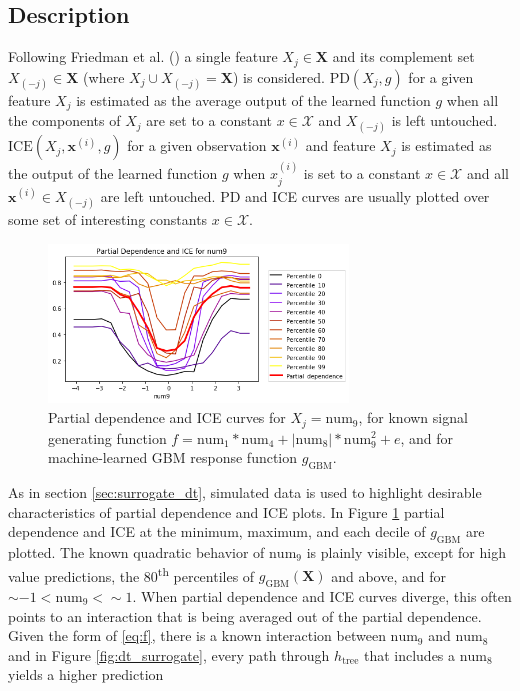 \documentclass{article}
\begin{document}
\subsection{Description}
	
Following Friedman et al. (\citeyear{esl}) a single feature $X_j \in \mathbf{X}$ and its complement set $X_{(-j)} \in \mathbf{X}$ (where $X_j \cup X_{(-j)} = \mathbf{X}$) is considered. $\text{PD}(X_j, g)$ for a given feature $X_j$ is estimated as the average output of the learned function $g$ when all the components of $X_j$ are set to a constant $x \in \mathcal{X}$ and $X_{(-j)}$ is left untouched. $\text{ICE}(X_j, \mathbf{x}^{(i)}, g)$ for a given observation $\mathbf{x}^{(i)}$ and feature $X_j$ is estimated as the output of the learned function $g$ when $x^{(i)}_j$ is set to a constant $x \in \mathcal{X}$ and all $\mathbf{x}^{(i)} \in X_{(-j)}$ are left untouched. PD and ICE curves are usually plotted over some set of interesting constants $x \in \mathcal{X}$. 

\begin{figure}[htb]
	\begin{center}
		\includegraphics[height=120pt]{img/pdp_ice.png}
		\caption{Partial dependence and ICE curves for $ X_j = \text{num}_9$, for known signal generating function $f = \text{num} _1 * \text{num}_4 + |\text{num}_8| * \text{num}_9^2 + e$, and for machine-learned GBM response function $g_{\text{GBM}}$.}
		\label{fig:pdp_ice}
	\end{center}
\end{figure}

As in section \ref{sec:surrogate_dt}, simulated data is used to highlight desirable characteristics of partial dependence and ICE plots. In Figure \ref{fig:pdp_ice} partial dependence and ICE at the minimum, maximum, and each decile of $g_{\text{GBM}}$ are plotted. The known quadratic behavior of $\text{num}_9$ is plainly visible, except for high value predictions, the 80\textsuperscript{th} percentiles of $g_{\text{GBM}}(\mathbf{X})$ and above, and for $\sim-1 < \text{num}_9 < \sim1$. When partial dependence and ICE curves diverge, this often points to an interaction that is being averaged out of the partial dependence. Given the form of \ref{eq:f}, there is a known interaction between $\text{num}_9$ and $\text{num}_8$ and in Figure \ref{fig:dt_surrogate}, every path through $h_{\text{tree}}$ that includes a $\text{num}_8$ yields a higher prediction 
\end{document}
